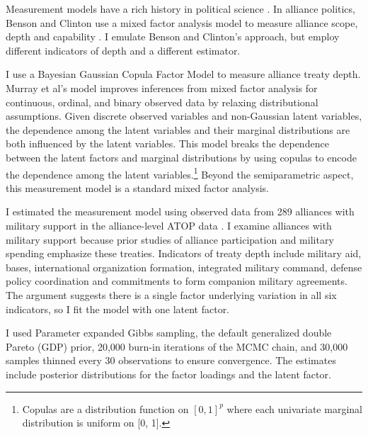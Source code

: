 \documentclass[12pt]{article}
\begin{document}
Measurement models have a rich history in political science \citep{Clintonetal2004, TreierJackman2008, Fariss2014}.
In alliance politics, Benson and Clinton use a mixed factor analysis model to measure alliance scope, depth and capability \citep{BensonClinton2016, Quinn2004}.  
I emulate Benson and Clinton's approach, but employ different indicators of depth and a different estimator. 


I use a Bayesian Gaussian Copula Factor Model \citep{Murrayetal2013} to measure alliance treaty depth. 
Murray et al's model improves inferences from mixed factor analysis for continuous, ordinal, and binary observed data by relaxing distributional assumptions. 
Given discrete observed variables and non-Gaussian latent variables, the dependence among the latent variables and their marginal distributions are both influenced by the latent variables.
This model breaks the dependence between the latent factors and marginal distributions by using copulas to encode the dependence among the latent variables.\footnote{Copulas are a distribution function on $[0, 1]^p$ where each univariate marginal distribution is uniform on [0, 1].}
Beyond the semiparametric aspect, this measurement model is a standard mixed factor analysis.


I estimated the measurement model using observed data from 289 alliances with military support in the alliance-level ATOP data \citep{Leedsetal2002}. 
I examine alliances with military support because prior studies of alliance participation and military spending emphasize these treaties.
Indicators of treaty depth include military aid, bases, international organization formation, integrated military command, defense policy coordination and commitments to form companion military agreements. 
The argument suggests there is a single factor underlying variation in all six indicators, so I fit the model with one latent factor. 


I used Parameter expanded Gibbs sampling, the default generalized double Pareto (GDP) prior, 20,000 burn-in iterations of the MCMC chain, and 30,000 samples thinned every 30 observations to ensure convergence. 
The estimates include posterior distributions for the factor loadings and the latent factor. 
\end{document}
